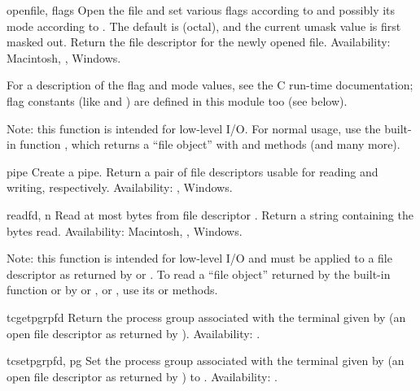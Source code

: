 \begin{funcdesc}{open}{file, flags}
Open the file  and set various flags according to
 and possibly its mode according to .
The default  is  (octal), and the current umask
value is first masked out.  Return the file descriptor for the newly
opened file.
Availability: Macintosh, \UNIX{}, Windows.

For a description of the flag and mode values, see the C run-time
documentation; flag constants (like  and
) are defined in this module too (see below).

Note: this function is intended for low-level I/O.  For normal usage,
use the built-in function , which returns a ``file
object'' with  and  methods (and many
more).
\end{funcdesc}

\begin{funcdesc}{pipe}{}
Create a pipe.  Return a pair of file descriptors  usable for reading and writing, respectively.
Availability: \UNIX{}, Windows.
\end{funcdesc}

\begin{funcdesc}{read}{fd, n}
Read at most  bytes from file descriptor .
Return a string containing the bytes read.
Availability: Macintosh, \UNIX{}, Windows.

Note: this function is intended for low-level I/O and must be applied
to a file descriptor as returned by  or
.  To read a ``file object'' returned by the
built-in function  or by  or
, or , use its
 or  methods.
\end{funcdesc}

\begin{funcdesc}{tcgetpgrp}{fd}
Return the process group associated with the terminal given by
 (an open file descriptor as returned by ).
Availability: \UNIX{}.
\end{funcdesc}

\begin{funcdesc}{tcsetpgrp}{fd, pg}
Set the process group associated with the terminal given by
 (an open file descriptor as returned by )
to .
Availability: \UNIX{}.
\end{funcdesc}

